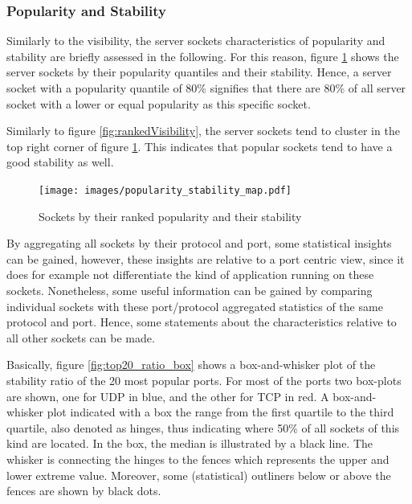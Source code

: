 \subsubsection{Popularity and Stability}

Similarly to the visibility, the \glspl{server socket} characteristics of popularity and stability are briefly assessed in the following. 
For this reason, figure \ref{fig:rankedPopularity} shows the \glspl{server socket} by their popularity quantiles and their stability. 
Hence, a \gls{server socket} with a popularity quantile of 80\% signifies that there are 80\% of all \gls{server socket} with a lower or equal popularity as this specific socket.


Similarly to figure \ref{fig:rankedVisibility}, the \glspl{server socket} tend to cluster in the top right corner of figure \ref{fig:rankedPopularity}. This indicates that popular sockets tend to have a good stability as well. 
\begin{figure}
	[ht] \centering 
	\texttt{[image: images/popularity\_stability\_map.pdf]} \caption{Sockets by their ranked popularity and their stability} 
	\label{fig:rankedPopularity} 
\end{figure}

By aggregating all sockets by their protocol and port, some statistical insights can be gained, however, these insights are relative to a port centric view, since it does for example not differentiate the kind of application running on these sockets. 
Nonetheless, some useful information can be gained by comparing individual sockets with these port/protocol aggregated statistics of the same protocol and port. 
Hence, some statements about the characteristics relative to all other sockets can be made.

Basically, figure \ref{fig:top20_ratio_box} shows a box-and-whisker plot of the stability ratio of the 20 most popular ports. 
For most of the ports two box-plots are shown, one for \gls{UDP} in blue, and the other for \gls{TCP} in red. 
A box-and-whisker plot indicated with a box the range from the first quartile to the third quartile, also denoted as hinges, thus indicating where 50\% of all sockets of this kind are located. 
In the box, the median is illustrated by a black line. 
The whisker is connecting the hinges to the fences which represents the upper and lower extreme value. 
Moreover, some (statistical) outliners below or above the fences are shown by black dots. 


